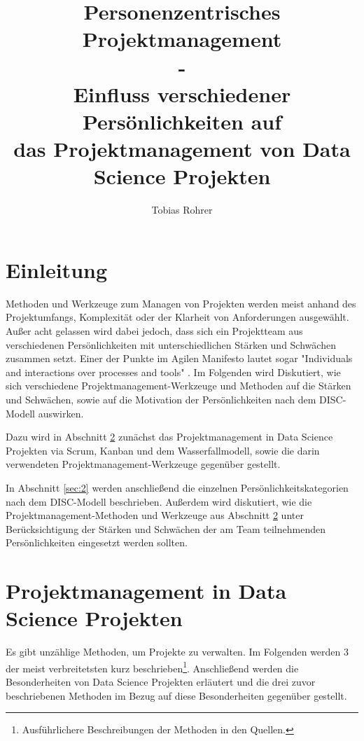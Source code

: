 \documentclass[twocolumn,10pt]{asme2ej}
\title{%
	Personenzentrisches Projektmanagement\\
	\large 
	- \\
	Einfluss verschiedener Persönlichkeiten auf \\ 
	das Projektmanagement von Data Science Projekten}
\author{Tobias Rohrer
    \affiliation{
	Hochschule Darmstadt\\
	Data Science (Master)\\
    Email: sttorohr@stud.h-da.de
    }	
}
\begin{document}
\maketitle    

\begin{abstract}


\end{abstract}

\section{Einleitung}
Methoden und Werkzeuge zum Managen von Projekten werden meist anhand des Projektumfangs, Komplexität oder der Klarheit von Anforderungen ausgewählt. Außer acht gelassen wird dabei jedoch, dass sich ein Projektteam aus verschiedenen Persönlichkeiten mit unterschiedlichen Stärken und Schwächen zusammen setzt. Einer der Punkte im Agilen Manifesto lautet sogar "Individuals and interactions over processes and tools" \cite{beck2001agile}. Im Folgenden wird Diskutiert, wie sich verschiedene Projektmanagement-Werkzeuge und Methoden auf die Stärken und Schwächen, sowie auf die Motivation der Persönlichkeiten nach dem DISC-Modell auswirken.

Dazu wird in Abschnitt \ref{sec:1} zunächst das Projektmanagement in Data Science Projekten via Scrum, Kanban und dem Wasserfallmodell, sowie die darin verwendeten Projektmanagement-Werkzeuge gegenüber gestellt.

In Abschnitt \ref{sec:2} werden anschließend die einzelnen Persönlichkeitskategorien nach dem DISC-Modell beschrieben. Außerdem wird diskutiert, wie die Projektmanagement-Methoden und Werkzeuge aus Abschnitt \ref{sec:1} unter Berücksichtigung der Stärken und Schwächen der am Team teilnehmenden Persönlichkeiten eingesetzt werden sollten.


\section{Projektmanagement in Data Science Projekten}\label{sec:1}
Es gibt unzählige Methoden, um Projekte zu verwalten. Im Folgenden werden 3 der meist verbreitetsten kurz beschrieben\footnote{Ausführlichere Beschreibungen der Methoden in den Quellen.}. Anschließend werden die Besonderheiten von Data Science Projekten erläutert und die drei zuvor beschriebenen Methoden im Bezug auf diese Besonderheiten gegenüber gestellt.
\end{document}
